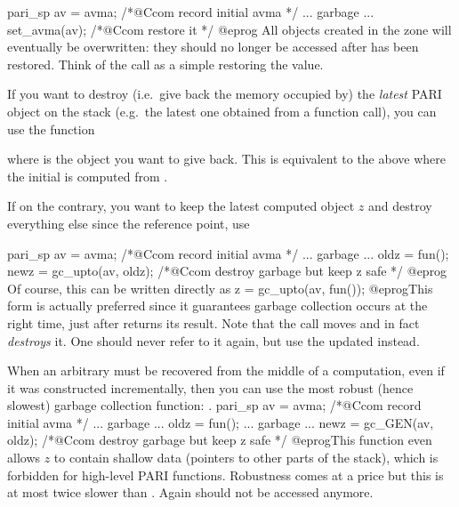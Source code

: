 \bprog
  pari_sp av = avma; /*@Ccom record initial avma */
  ... garbage ...
  set_avma(av); /*@Ccom restore it */
@eprog
\noindent All objects created in the  zone will eventually
be overwritten: they should no longer be accessed after  has been
restored. Think of the  call as a simple 
restoring the  value.

\noindent\item
If you want to destroy (i.e.~give back the memory occupied by) the
\emph{latest} PARI object on the stack (e.g.~the latest one obtained from a
function call), you can use the function%


\noindent where  is the object you want to give back. This is
equivalent to the above where the initial  is computed from .

\noindent\item
If on the contrary, you want to keep the latest computed object $z$ and destroy
everything else since the reference point, use

\bprog
  pari_sp av = avma; /*@Ccom record initial avma */
  ... garbage ...
  oldz = fun();
  newz = gc_upto(av, oldz); /*@Ccom destroy garbage but keep z safe */
@eprog
Of course, this can be written directly as
\bprog
  z = gc_upto(av, fun());
@eprog\noindent This form is actually preferred since it guarantees garbage
collection occurs at the right time, just after  returns its
result. Note that the  call moves  and in fact
\emph{destroys} it. One should never refer to it again, but use the updated
 instead.

\noindent\item
When an arbitrary  must be recovered from the middle of a
computation, even if it was constructed incrementally, then you can use
the most robust (hence slowest) garbage collection function: .
\bprog
  pari_sp av = avma; /*@Ccom record initial avma */
  ... garbage ...
  oldz = fun();
  ... garbage ...
  newz = gc_GEN(av, oldz); /*@Ccom destroy garbage but keep z safe */
@eprog\noindent This function even allows $z$ to contain shallow data
(pointers to other parts of the stack), which is forbidden for high-level
PARI functions. Robustness comes at a price but this is at most twice slower
than . Again  should not be accessed anymore.

